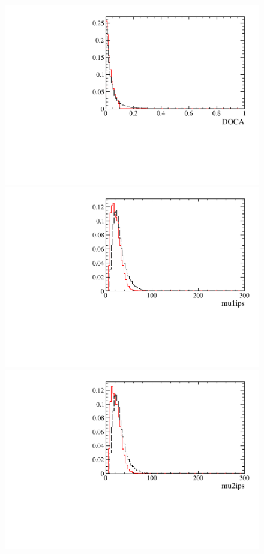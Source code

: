 \documentclass[12pt,a4paper]{article}
\begin{document}
\begin{figure} [htb!]
\begin{center}
\includegraphics[scale=0.20]{figs/DOCAPARTIALptcut.pdf}
\includegraphics[scale=0.20]{figs/mu1ipsPARTIALptcut.pdf}
\includegraphics[scale=0.20]{figs/mu2ipsPARTIALptcut.pdf}

\end{center}
\end{figure}
\end{document}
